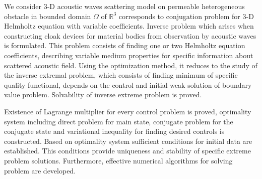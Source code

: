 \documentclass[12pt,a4paper]{article}
\begin{document}
We consider 3-D acoustic waves scattering model on permeable heterogeneous obstacle in bounded domain $\Omega$ of $\mathbb{R}^3$ corresponds to conjugation problem for 3-D Helmholtz 
equation with variable coefficients. Inverse problem which arises when constructing 
cloak devices for material bodies from observation by acoustic waves is formulated. 
This problem consists of finding one or two Helmholtz equation coefficients, describing 
variable medium properties for specific information about scattered acoustic field.
Using the optimization method, it reduces to the study of the inverse extremal problem,
which
consists of finding minimum of specific quality functional, depends on the control and
initial weak solution of boundary value problem. Solvability of inverse extreme problem
is proved.

Existence of Lagrange multiplier for every control problem is proved, optimality system 
including direct problem for main state, conjugate problem for the conjugate state
and variational inequality for finding desired controls is constructed.
Based on optimality system sufficient conditions for initial data are established.
This conditions provide uniqueness and stability of specific extreme problem solutions.
Furthermore, effective numerical algorithms for solving problem are developed.
\end{document}
